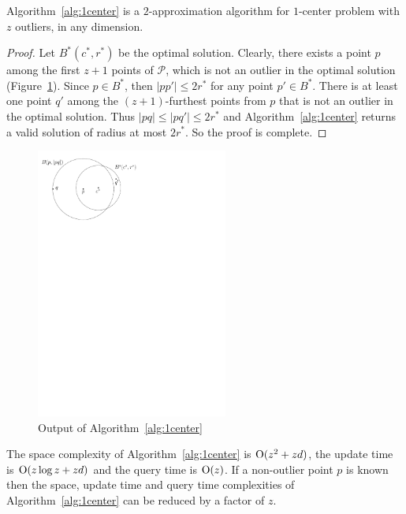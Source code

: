\documentclass[envcountsame]{cls/cccg15}
\newcommand{\cO}{\ensuremath{{\rm O}}}
\newcommand{\card}[1]{\left|{#1}\right|}
\newcommand{\lee}{\leqslant}
\renewcommand{\le}{\lee}
\begin{document}
\begin{theorem}
Algorithm~\ref{alg:1center} is a $2$-approximation algorithm for $1$-center problem with $z$ outliers, in any dimension.
\end{theorem}

\begin{proof}
Let $B^*(c^*, r^*)$ be the optimal solution. Clearly, there exists a point $p$ among the first $z+1$ points of $\mathcal{P}$, which is not an outlier in the optimal solution (Figure~\ref{fig:1center}). Since $p \in B^*$, then $\card{pp'} \le 2r^*$ for any point $p'\in B^*$. There is at least one point $q'$ among the $(z+1)$-furthest points from $p$ that is not an outlier in the optimal solution. Thus $\card{pq} \le \card{pq'} \le 2r^*$ and Algorithm~\ref{alg:1center} returns a valid solution of radius at most $2r^*$. So the proof is complete.
\end{proof}


\begin{figure}[h]
	\centering
	\includegraphics[width=17em]{figs/one-center}
	\caption{Output of Algorithm~\ref{alg:1center}}
	\label{fig:1center}
\end{figure}


The space complexity of Algorithm~\ref{alg:1center} is $\cO(z^2 + zd)$, the update time is $\cO (z \log z + zd)$ and the query time is $\cO (z)$.
If a non-outlier point $p$ is known then the space, update time and query time complexities of Algorithm~\ref{alg:1center} can be reduced by a factor of $z$.
\end{document}
